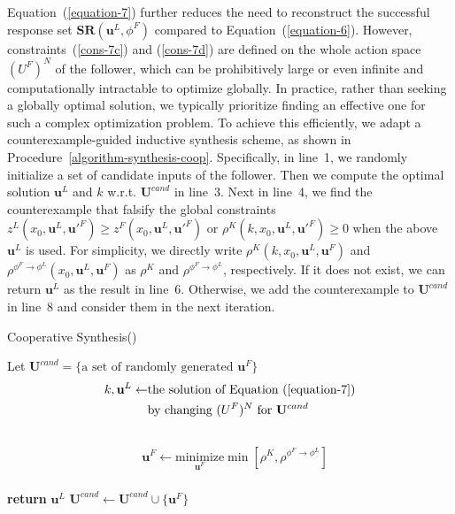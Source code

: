 \documentclass[letterpaper, 10 pt, conference]{ieeeconf}
\begin{document}
Equation~(\ref{equation-7}) further reduces the need to reconstruct the successful response set $\mathbf{SR}(\mathbf{u}^L, \phi^F)$ compared to Equation~(\ref{equation-6}). However, constraints~(\ref{cons-7c}) and (\ref{cons-7d}) are defined on the whole action space $(U^F)^N$ of the follower, which can be prohibitively large or even infinite and computationally intractable to optimize globally.
In practice, rather than seeking a globally optimal solution, we typically prioritize finding an effective one for such a complex optimization problem. To achieve this efficiently, we adapt a counterexample-guided inductive synthesis scheme, as shown in Procedure~\ref{algorithm-synthesis-coop}. Specifically, in line~1, we randomly initialize a set of candidate inputs of the follower. Then we compute the optimal solution $\mathbf{u}^L$ and $k$ w.r.t. $\mathbf{U}^{cand}$ in line~3. 
Next in line~4, we find the counterexample that falsify the global constraints $z^L(x_0,\mathbf{u}^L,\mathbf{u}'^F)\geq z^F(x_0,\mathbf{u}^L,\mathbf{u}'^F)$ or $\rho^K(k,x_0,\mathbf{u}^L,\mathbf{u}'^F)\geq0$ when the above $\mathbf{u}^L$ is used. 
For simplicity, we directly write $\rho^K(k,x_0,\mathbf{u}^L,\mathbf{u}^F)$ and $\rho^{\phi^F\to\phi^L}(x_0,\mathbf{u}^L,\mathbf{u}^F)$ as $\rho^K$ and $\rho^{\phi^F\to\phi^L}$, respectively.
If it does not exist, we can return $\mathbf{u}^L$ as the result in line~6. Otherwise, we add the  counterexample to $\mathbf{U}^{cand}$ in line~8 and consider them in the next iteration.

\begin{procedure}
    \caption{Cooperative Synthesis()}
    \label{algorithm-synthesis-coop}
	Let $\mathbf{U}^{cand}=\{\text{a set of randomly generated }\mathbf{u}^F\}$\\
        { \text{ } \vspace{-19pt} 
	\begin{align}
            k, \mathbf{u}^L \leftarrow &\text{the solution of Equation~(\ref{equation-7})} \nonumber \\ 
             & \text{by changing } (U^F)^N \text{ for } \mathbf{U}^{cand} \nonumber 
        \end{align} \\
        \text{ } \vspace{-20pt}
        \begin{align}
            &\mathbf{u}^F \leftarrow \underset{\mathbf{u}^F}{\text{minimize}}\min[\rho^K, \rho^{\phi^F\to\phi^L}] \nonumber
        \end{align} \\
	{\textbf{return} $\mathbf{u}^L$}
	{$\mathbf{U}^{cand}\leftarrow \mathbf{U}^{cand}\cup \{\mathbf{u}^F\}$} 
 }
\end{procedure}
\end{document}
